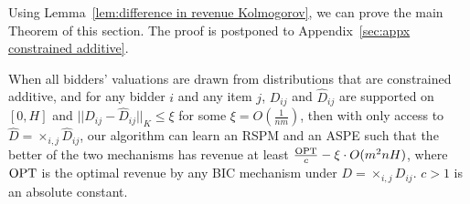 {Using  Lemma~\ref{lem:difference in revenue Kolmogorov}, we can prove the main Theorem of this section. The proof is postponed to Appendix~\ref{sec:appx constrained additive}.

\begin{theorem}\label{thm:constrained additive Kolmogorov}
	When all bidders' valuations are drawn from distributions that are constrained additive, and for any bidder $i$ and any item $j$, $D_{ij}$ and $\hat{D}_{ij}$ are supported on $[0,H]$ and $||D_{ij}-\hat{D}_{ij}||_K\leq \xi$  for some $\xi=O(\frac{1}{nm})$, then with only access to $\hat{D}=\times_{i,j} \hat{D}_{ij}$, our algorithm can learn an RSPM and an ASPE such that the better of the two mechanisms has revenue at least $\frac{\text{OPT}}{c}-{\xi\cdot O(m^2n H)}$, where $\text{OPT}$ is the optimal revenue by any BIC mechanism under $D=\times_{i,j} D_{ij}$. $c>1$ is an absolute constant.%
\end{theorem}

}

